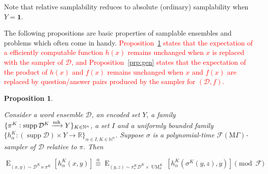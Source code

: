 \documentclass[11pt]{article}
\numberwithin{equation}{section}
\theoremstyle{definition}
\theoremstyle{plain}
\newtheorem{proposition}{Proposition}[section]
\DeclareMathOperator{\Supp}{supp}
\DeclareMathOperator{\E}{E}
\DeclareMathOperator{\UM}{UM}
\newcommand{\Nats}{\mathbb{N}}
\newcommand{\Reals}{\mathbb{R}}
\newcommand{\Dist}{\mathcal{D}}
\newcommand{\MGrow}{\mathrm{M}\Gamma}
\newcommand{\Fall}{\mathcal{F}}
\newcommand{\EMG}{\Fall(\MGrow)}
\newcommand{\Markov}{\xrightarrow{\textnormal{mk}}}
\begin{document}
Note that relative samplability reduces to absolute (ordinary) samplability when $Y=\bm{1}$.

The following propositions are basic properties of samplable ensembles and problems which often come in handy. \textcolor{red}{Proposition~\ref{prp:smp} states that the expectation of a efficiently computable function $h(x)$ remains unchanged when $x$ is replaced with the sampler of $\Dist$, and Proposition~\ref{prp:gen} states that the expectation of the product of $h(x)$ and $f(x)$ remains unchanged when $x$ and $f(x)$ are replaced by question/answer pairs produced by the sampler for $(\Dist,f)$.}

\begin{samepage}
\begin{proposition}
\label{prp:smp}

Consider a word ensemble $\Dist$, an encoded set $Y$, a family\\ $\{\pi^K: \Supp \Dist^{K} \Markov Y\}_{K \in \Nats^n}$, a set ${I}$ and a uniformly bounded family\\ $\{h_\alpha^K: (\Supp \Dist) \times Y \rightarrow \Reals\}_{\alpha \in I, K \in \Nats^n}$. Suppose $\sigma$ is a polynomial-time $\EMG$-sampler of $\Dist$ relative to $\pi$. Then

\begin{equation}
\label{eqn:prp__smp}
\E_{(x,y) \sim \Dist^{K} \ltimes \pi^K}[h_\alpha^K(x,y)] \overset{\alpha}{\equiv} \E_{(y,z) \sim \pi_*^K\Dist^{K} \times \UM_\sigma^K}[h_\alpha^K(\sigma^K(y,z),y)] \pmod \Fall
\end{equation}

\end{proposition}
\end{samepage}
\end{document}
